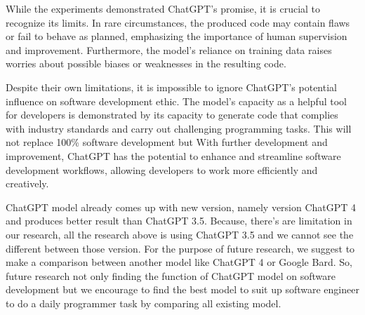 \documentclass[conference]{IEEEtran}
\begin{document}
While the experiments demonstrated ChatGPT's promise, it is crucial to recognize its limits. In rare circumstances, the produced code may contain flaws or fail to behave as planned, emphasizing the importance of human supervision and improvement. Furthermore, the model's reliance on training data raises worries about possible biases or weaknesses in the resulting code.

Despite their own limitations, it is impossible to ignore ChatGPT's potential influence on software development ethic. The model's capacity as a helpful tool for developers is demonstrated by its capacity to generate code that complies with industry standards and carry out challenging programming tasks. This will not replace 100\% software development but With further development and improvement, ChatGPT has the potential to enhance and streamline software development workflows, allowing developers to work more efficiently and creatively.

ChatGPT model already comes up with new version, namely version ChatGPT 4 and produces better result than ChatGPT 3.5. Because, there's are limitation in our research, all the research above is using ChatGPT 3.5 and we cannot see the different between those version. For the purpose of future research, we suggest to make a comparison between another model like ChatGPT 4 or Google Bard. So, future research not only finding the function of ChatGPT model on software development but we encourage to find the best model to suit up software engineer to do a daily programmer task by comparing all existing model.  
\end{document}
